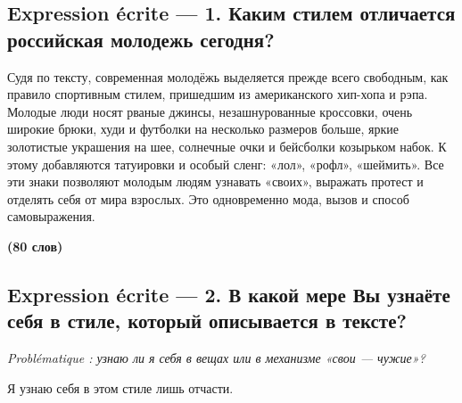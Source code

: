 \documentclass[11pt,a4paper]{article}
\begin{document}
\hypertarget{expression-uxe9crite-1.-ux43aux430ux43aux438ux43c-ux441ux442ux438ux43bux435ux43c-ux43eux442ux43bux438ux447ux430ux435ux442ux441ux44f-ux440ux43eux441ux441ux438ux439ux441ux43aux430ux44f-ux43cux43eux43bux43eux434ux435ux436ux44c-ux441ux435ux433ux43eux434ux43dux44f}{%
\subsection{Expression écrite --- 1. Каким стилем отличается российская молодежь сегодня?}\label{expression-uxe9crite-1.-ux43aux430ux43aux438ux43c-ux441ux442ux438ux43bux435ux43c-ux43eux442ux43bux438ux447ux430ux435ux442ux441ux44f-ux440ux43eux441ux441ux438ux439ux441ux43aux430ux44f-ux43cux43eux43bux43eux434ux435ux436ux44c-ux441ux435ux433ux43eux434ux43dux44f}}

Судя по тексту, современная молодёжь выделяется прежде всего свободным, как правило спортивным стилем, пришедшим из американского хип-хопа и рэпа. Молодые люди носят рваные джинсы, незашнурованные кроссовки, очень широкие брюки, худи и футболки на несколько размеров больше, яркие золотистые украшения на шее, солнечные очки и бейсболки козырьком набок. К этому добавляются татуировки и особый сленг: «лол», «рофл», «шеймить». Все эти знаки позволяют молодым людям узнавать «своих», выражать протест и отделять себя от мира взрослых. Это одновременно мода, вызов и способ самовыражения.

\textbf{(80 слов)}

\hypertarget{expression-uxe9crite-2.-ux432-ux43aux430ux43aux43eux439-ux43cux435ux440ux435-ux432ux44b-ux443ux437ux43dux430ux451ux442ux435-ux441ux435ux431ux44f-ux432-ux441ux442ux438ux43bux435-ux43aux43eux442ux43eux440ux44bux439-ux43eux43fux438ux441ux44bux432ux430ux435ux442ux441ux44f-ux432-ux442ux435ux43aux441ux442ux435}{%
\subsection{Expression écrite --- 2. В какой мере Вы узнаёте себя в стиле, который описывается в тексте?}\label{expression-uxe9crite-2.-ux432-ux43aux430ux43aux43eux439-ux43cux435ux440ux435-ux432ux44b-ux443ux437ux43dux430ux451ux442ux435-ux441ux435ux431ux44f-ux432-ux441ux442ux438ux43bux435-ux43aux43eux442ux43eux440ux44bux439-ux43eux43fux438ux441ux44bux432ux430ux435ux442ux441ux44f-ux432-ux442ux435ux43aux441ux442ux435}}

\emph{Problématique : узнаю ли я себя в вещах или в механизме «свои --- чужие»?}

Я узнаю себя в этом стиле лишь отчасти.
\end{document}
